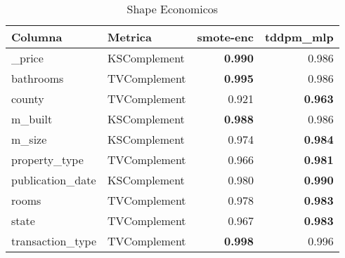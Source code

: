 \begin{table}[H]
\centering
\caption{Shape Economicos}
\label{table-shape-economicos-a-3}
\begin{tabular}{|l|l|r|r|}
\hline
\rowcolor[gray]{0.8}
Columna & Metrica & smote-enc & tddpm\_mlp \\
\hline \_price & KSComplement & \bfseries 0.990 & 0.986 \\
\hline bathrooms & TVComplement & \bfseries 0.995 & 0.986 \\
\hline county & TVComplement & 0.921 & \bfseries 0.963 \\
\hline m\_built & KSComplement & \bfseries 0.988 & 0.986 \\
\hline m\_size & KSComplement & 0.974 & \bfseries 0.984 \\
\hline property\_type & TVComplement & 0.966 & \bfseries 0.981 \\
\hline publication\_date & KSComplement & 0.980 & \bfseries 0.990 \\
\hline rooms & TVComplement & 0.978 & \bfseries 0.983 \\
\hline state & TVComplement & 0.967 & \bfseries 0.983 \\
\hline transaction\_type & TVComplement & \bfseries 0.998 & 0.996 \\
\hline
\end{tabular}
\end{table}

